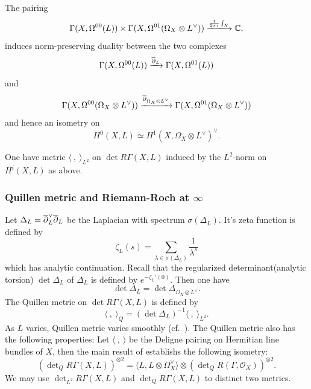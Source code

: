 \documentclass[]{amsart}
\newcommand{\BC}{{\mathbb {C}}} \newcommand{\BD}{{\mathbb {D}}}
\newcommand{\CO}{{\mathcal {O}}} \newcommand{\CP}{{\mathcal {P}}}
\newcommand{\pair}[1]{\langle {#1} \rangle}
\theoremstyle{plain}
\theoremstyle{remark} \newtheorem{remark}[thm]{Remark}
\theoremstyle{remark} \newtheorem{exercise}{Exercise}
\theoremstyle{remark} \newtheorem{example}{Example}
\numberwithin{equation}{section}
\begin{document}
The pairing 
\[\Gamma(X,\Omega^{00}(L))\times \Gamma(X,\Omega^{01}(\Omega_X\otimes L^\vee))\xlongrightarrow{\frac{1}{2\pi i}\int_X} \BC,\]
induces norm-preserving duality between the two complexes 
\[\Gamma(X,\Omega^{00}(L))\xrightarrow{\overline{\partial}_{L}}\Gamma(X,\Omega^{01}(L))\]
 and 
 \[\Gamma(X,\Omega^{00}(\Omega_X\otimes L^\vee))\xrightarrow{\overline{\partial}_{\Omega_X\otimes L^\vee}}\Gamma(X,\Omega^{01}(\Omega_X\otimes L^\vee))\] and hence an isometry on 
 \begin{equation}\label{sd}H^0(X,L)\simeq H^1(X,\Omega_X\otimes L^\vee)^\vee.\end{equation} 
 
One have metric $\pair{\ ,\ }_{L^2}$ on $\det R\Gamma(X,L)$ induced by the $L^2$-norm on $H^i(X,L)$ as above. 

\subsubsection{Quillen metric and Riemann-Roch at $\infty$}\label{Sqmrr}
 Let $\Delta_L=\overline{\partial}_{L}^\vee\overline{\partial}_{L}$ be the Laplacian with spectrum $\sigma(\Delta_L)$. It's zeta function is defined by \[\zeta_L(s)=\sum_{\lambda\in\sigma(\Delta_L)}\frac{1}{\lambda^s}\] which has analytic continuation. Recall that the regularized determinant(analytic torsion) $\det \Delta_{L}$ of $\Delta_L$ is defined by $e^{-\zeta_{L}'(0)}$. Then one have \begin{equation}\label{lap}\det \Delta_L=\det \Delta_{\Omega_X\otimes L^\vee}.\end{equation}
 The Quillen metric on $\det R\Gamma(X,L)$ is defined by \begin{equation}\label{l2q}\pair{\ ,\ }_{Q}=(\det \Delta_L)^{-1}\pair{\ ,\ }_{L^2}.\end{equation}
As $L$ varies, Quillen metric varies smoothly (cf.~\cite{Quillen:85}).
The Quillen metric also has the following properties: Let $\pair{\ ,\ }$ be the Deligne pairing on Hermitian line bundles of $X$, then the main result of \cite{Deligne:85} establishs the following isometry:
 \[(\det\nolimits_Q R\Gamma(X,L))^{\otimes 2}=\pair{L,L\otimes\Omega_X^\vee}\otimes (\det\nolimits_Q R(\Gamma,\CO_{X}))^{\otimes 2}.\]
  We may use $\det_{L^2} R\Gamma(X,L)$ and $\det_{Q} R\Gamma(X,L)$ to distinct two metrics.
\end{document}
